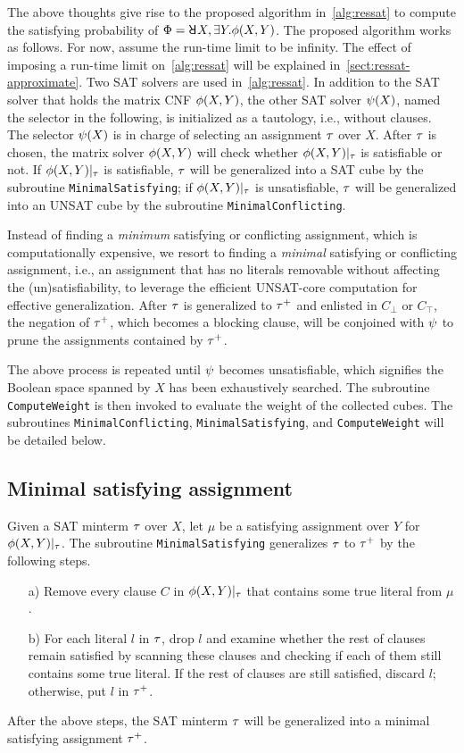 The above thoughts give rise to the proposed algorithm in~\cref{alg:ressat} to compute the satisfying probability of $\Qf=\random{} X,\exists Y.\pf(X,Y)$.
The proposed algorithm works as follows.
For now, assume the run-time limit \timeout to be infinity.
The effect of imposing a run-time limit on~\cref{alg:ressat} will be explained in~\cref{sect:ressat-approximate}.
Two SAT solvers are used in~\cref{alg:ressat}.
In addition to the SAT solver that holds the matrix CNF $\phi(X,Y)$,
the other SAT solver $\psi(X)$, named the selector in the following,
is initialized as a tautology, i.e., without clauses.
The selector $\psi(X)$ is in charge of selecting an assignment $\tau$ over $X$.
After $\tau$ is chosen, the matrix solver $\phi(X,Y)$ will check whether $\phi(X,Y)|_{\tau}$ is satisfiable or not.
If $\phi(X,Y)|_{\tau}$ is satisfiable,
$\tau$ will be generalized into a SAT cube by the subroutine \texttt{MinimalSatisfying};
if $\phi(X,Y)|_{\tau}$ is unsatisfiable,
$\tau$ will be generalized into an UNSAT cube by the subroutine \texttt{MinimalConflicting}.

Instead of finding a \textit{minimum} satisfying or conflicting assignment,
which is computationally expensive,
we resort to finding a \textit{minimal} satisfying or conflicting assignment,
i.e., an assignment that has no literals removable without affecting the (un)satisfiability,
to leverage the efficient UNSAT-core computation for effective generalization.
After $\tau$ is generalized to $\tau^+$ and enlisted in $C_\bot$ or $C_\top$,
the negation of $\tau^+$, which becomes a blocking clause,
will be conjoined with $\psi$ to prune the assignments contained by $\tau^+$.

The above process is repeated until $\psi$ becomes unsatisfiable,
which signifies the Boolean space spanned by $X$ has been exhaustively searched.
The subroutine \texttt{ComputeWeight} is then invoked to evaluate the weight of the collected cubes.
The subroutines \texttt{MinimalConflicting}, \texttt{MinimalSatisfying}, and \texttt{ComputeWeight} will be detailed below.

\subsection{Minimal satisfying assignment}
Given a SAT minterm $\tau$ over $X$,
let $\mu$ be a satisfying assignment over $Y$ for $\phi(X,Y)|_{\tau}$.
The subroutine \texttt{MinimalSatisfying} generalizes $\tau$ to $\tau^+$ by the following steps.
\begin{itemize}
    \item[a)] Remove every clause $C$ in $\phi(X,Y)|_{\tau}$ that contains some true literal from $\mu$.
    \item[b)] For each literal $l$ in $\tau$, drop $l$ and examine whether the rest of clauses remain satisfied
          by scanning these clauses and checking if each of them still contains some true literal.
          If the rest of clauses are still satisfied, discard $l$; otherwise, put $l$ in $\tau^+$.
\end{itemize}
After the above steps, the SAT minterm $\tau$ will be generalized into a minimal satisfying assignment $\tau^+$.

